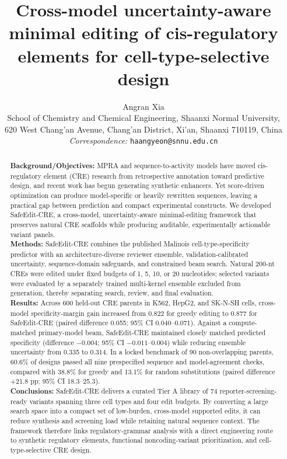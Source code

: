 \documentclass[10pt,a4paper]{article}
\title{\textbf{Cross-model uncertainty-aware minimal editing of cis-regulatory elements for cell-type-selective design}}
\author{Angran Xia\\
School of Chemistry and Chemical Engineering, Shaanxi Normal University,\\
620 West Chang'an Avenue, Chang'an District, Xi'an, Shaanxi 710119, China\\[0.35em]
\textit{Correspondence:} \texttt{haangyeon@snnu.edu.cn}}
\date{}
\begin{document}
\maketitle
\linenumbers

\begin{abstract}
\textbf{Background/Objectives:} MPRA and sequence-to-activity models have moved
cis-regulatory element (CRE) research from retrospective annotation toward predictive
design, and recent work has begun generating synthetic enhancers. Yet score-driven
optimization can produce model-specific or heavily rewritten sequences, leaving a
practical gap between prediction and compact experimental constructs. We developed
SafeEdit-CRE, a cross-model, uncertainty-aware minimal-editing framework that preserves
natural CRE scaffolds while producing auditable, experimentally actionable variant
panels.\\
\textbf{Methods:} SafeEdit-CRE combines the published Malinois cell-type-specificity
predictor with an architecture-diverse reviewer ensemble, validation-calibrated
uncertainty, sequence-domain safeguards, and constrained beam search. Natural 200-nt
CREs were edited under fixed budgets of 1, 5, 10, or 20 nucleotides; selected variants
were evaluated by a separately trained multi-kernel ensemble excluded from generation,
thereby separating search, review, and final evaluation.\\
\textbf{Results:} Across 600 held-out CRE parents in K562, HepG2, and SK-N-SH cells,
cross-model specificity-margin gain increased from 0.822 for greedy editing to 0.877
for SafeEdit-CRE (paired difference 0.055; 95\% CI 0.040--0.071). Against a
compute-matched primary-model beam, SafeEdit-CRE maintained closely matched predicted
specificity (difference $-0.004$; 95\% CI $-0.011$--$0.004$) while reducing ensemble
uncertainty from 0.335 to 0.314. In a locked benchmark of 90 non-overlapping parents,
60.6\% of designs passed all nine prespecified sequence and model-agreement checks,
compared with 38.8\% for greedy and 13.1\% for random substitutions (paired
difference +21.8 pp; 95\% CI 18.3--25.3).\\
\textbf{Conclusions:} SafeEdit-CRE delivers a curated Tier A library of 74
reporter-screening-ready variants spanning three cell types and four edit budgets.
By converting a large search space into a compact set of low-burden, cross-model
supported edits, it can reduce synthesis and screening load while retaining natural
sequence context. The framework therefore links regulatory-grammar analysis with a
direct engineering route to synthetic regulatory elements, functional noncoding-variant
prioritization, and cell-type-selective CRE design.
\end{abstract}
\end{document}
